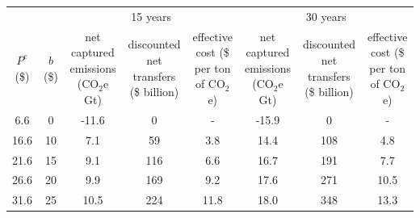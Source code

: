 \begin{tabular}{cccccccc}
\toprule
&& \multicolumn{3}{c}{15 years} & \multicolumn{3}{c}{30 years} \\
\cmidrule[1pt](r){3-5} \cmidrule[1pt](r){6-8}
\makecell[c]{$P^e$ \\ (\$)} & \makecell[c]{$b$ \\ (\$)} & \makecell[c]{net captured \\ emissions \\ (CO$_2$e Gt)} & \makecell[c]{discounted \\ net transfers \\  (\$ billion)} & \makecell[c]{  effective cost \\ (\$ per ton \\ of CO$_2$e)} & \makecell[c]{net captured \\ emissions \\ (CO$_2$e Gt)} & \makecell[c]{discounted \\ net transfers \\ (\$ billion)} & \makecell[c]{  effective cost \\ (\$ per ton \\ of CO$_2$e)} \\
\midrule

6.6 & 0 & -11.6 & 0 & - & -15.9 & 0 & - \\
16.6 & 10 & 7.1 & 59 & 3.8 & 14.4 & 108 & 4.8 \\
21.6 & 15 & 9.1 & 116 & 6.6 & 16.7 & 191 & 7.7 \\
26.6 & 20 & 9.9 & 169 & 9.2 & 17.6 & 271 & 10.5 \\
31.6 & 25 & 10.5 & 224 & 11.8  & 18.0 & 348 & 13.3 \\
\bottomrule
\end{tabular}
